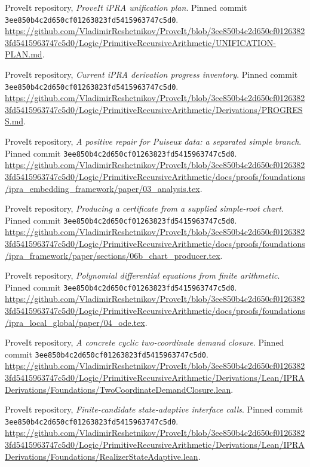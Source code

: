  ProveIt repository, \emph{ProveIt iPRA unification plan}.
Pinned commit \texttt{3ee850b4c2d650cf01263823fd5415963747c5d0}.
\url{https://github.com/VladimirReshetnikov/ProveIt/blob/3ee850b4c2d650cf01263823fd5415963747c5d0/Logic/PrimitiveRecursiveArithmetic/UNIFICATION-PLAN.md}.

 ProveIt repository, \emph{Current iPRA derivation progress inventory}.
Pinned commit \texttt{3ee850b4c2d650cf01263823fd5415963747c5d0}.
\url{https://github.com/VladimirReshetnikov/ProveIt/blob/3ee850b4c2d650cf01263823fd5415963747c5d0/Logic/PrimitiveRecursiveArithmetic/Derivations/PROGRESS.md}.

 ProveIt repository, \emph{A positive repair for Puiseux data: a separated simple branch}.
Pinned commit \texttt{3ee850b4c2d650cf01263823fd5415963747c5d0}.
\url{https://github.com/VladimirReshetnikov/ProveIt/blob/3ee850b4c2d650cf01263823fd5415963747c5d0/Logic/PrimitiveRecursiveArithmetic/docs/proofs/foundations/ipra_embedding_framework/paper/03_analysis.tex}.

 ProveIt repository, \emph{Producing a certificate from a supplied simple-root chart}.
Pinned commit \texttt{3ee850b4c2d650cf01263823fd5415963747c5d0}.
\url{https://github.com/VladimirReshetnikov/ProveIt/blob/3ee850b4c2d650cf01263823fd5415963747c5d0/Logic/PrimitiveRecursiveArithmetic/docs/proofs/foundations/ipra_framework/paper/sections/06b_chart_producer.tex}.

 ProveIt repository, \emph{Polynomial differential equations from finite arithmetic}.
Pinned commit \texttt{3ee850b4c2d650cf01263823fd5415963747c5d0}.
\url{https://github.com/VladimirReshetnikov/ProveIt/blob/3ee850b4c2d650cf01263823fd5415963747c5d0/Logic/PrimitiveRecursiveArithmetic/docs/proofs/foundations/ipra_local_global/paper/04_ode.tex}.

 ProveIt repository, \emph{A concrete cyclic two-coordinate demand closure}.
Pinned commit \texttt{3ee850b4c2d650cf01263823fd5415963747c5d0}.
\url{https://github.com/VladimirReshetnikov/ProveIt/blob/3ee850b4c2d650cf01263823fd5415963747c5d0/Logic/PrimitiveRecursiveArithmetic/Derivations/Lean/IPRADerivations/Foundations/TwoCoordinateDemandClosure.lean}.

 ProveIt repository, \emph{Finite-candidate state-adaptive interface calls}.
Pinned commit \texttt{3ee850b4c2d650cf01263823fd5415963747c5d0}.
\url{https://github.com/VladimirReshetnikov/ProveIt/blob/3ee850b4c2d650cf01263823fd5415963747c5d0/Logic/PrimitiveRecursiveArithmetic/Derivations/Lean/IPRADerivations/Foundations/RealizerStateAdaptive.lean}.

